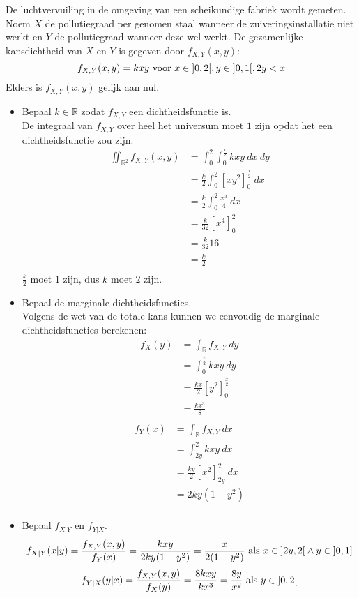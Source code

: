 \documentclass[main.tex]{subfiles}
\begin{document}
\begin{oef}
  De luchtvervuiling in de omgeving van een scheikundige fabriek wordt gemeten.
  Noem $X$ de pollutiegraad per genomen staal wanneer de zuiveringsinstallatie niet werkt en $Y$ de  pollutiegraad wanneer deze wel werkt.
  De gezamenlijke kansdichtheid van $X$ en $Y$ is gegeven door $f_{X,Y}(x,y)$:
  \[ f_{X,Y}(x,y) = kxy \text{ voor } x \in \interval[open]{0}{2}, y \in \interval[open]{0}{1}, 2y < x \]
  Elders is $f_{X,Y}(x,y)$ gelijk aan nul.
  \begin{itemize}
  \item Bepaal $k\in \mathbb{R}$ zodat $f_{X,Y}$ een dichtheidsfunctie is.\\
    De integraal van $f_{X,Y}$ over heel het universum moet $1$ zijn opdat het een dichtheidsfunctie zou zijn.
    \[
    \begin{array}{rl}
      \iint_{\mathbb{R}^{2}}f_{X,Y}(x,y)
      &= \int_{0}^{2}\int_{0}^{\frac{x}{2}}kxy\ dx\ dy\\
      &= \frac{k}{2} \int_{0}^{2}\left[ xy^{2}\right]_{0}^{\frac{x}{2}}\ dx\\
      &= \frac{k}{2} \int_{0}^{2}\frac{x^{3}}{4}\ dx\\
      &= \frac{k}{32} \left[ x^{4}\right]_{0}^{2}\\
      &= \frac{k}{32} 16\\
      &= \frac{k}{2}\\
    \end{array}
    \]
    $\frac{k}{2}$ moet $1$ zijn, dus $k$ moet $2$ zijn.
  \item Bepaal de marginale dichtheidsfuncties.\\
    Volgens de wet van de totale kans kunnen we eenvoudig de marginale dichtheidsfuncties berekenen:
    \[
    \begin{array}{rl}
      f_{X}(y)
      &= \int_{\mathbb{R}}f_{X,Y}\ dy\\
      &= \int_{0}^{\frac{x}{2}} kxy\ dy\\
      &= \frac{kx}{2} \left[ y^{2} \right]_{0}^{\frac{x}{2}}\\
      &= \frac{kx^{3}}{8}\\
    \end{array}
    \]
    \[
    \begin{array}{rl}
      f_{Y}(x)
      &= \int_{\mathbb{R}}f_{X,Y}\ dx\\
      &= \int_{2y}^{2} kxy\ dx\\
      &= \frac{ky}{2} \left[ x^{2} \right]_{2y}^{2}\ dx\\
      &= 2ky(1-y^{2})\\
    \end{array}
    \]
  \item Bepaal $f_{X|Y}$ en $f_{Y|X}$.\\
    \[ f_{X|Y}(x|y) = \frac{f_{X,Y}(x,y)}{f_{Y}(x)} = \frac{kxy}{2ky(1-y^{2})} = \frac{x}{2(1-y^{2})} \text{ als } x\in \interval[open]{2y}{2} \wedge y \in \interval[open left]{0}{1} \]
    \[ f_{Y|X}(y|x) = \frac{f_{X,Y}(x,y)}{f_{X}(y)} = \frac{8kxy}{kx^{3}} = \frac{8y}{x^{2}} \text{ als } y \in \interval[open]{0}{2} \]
  \end{itemize}
\end{oef}
\end{document}
